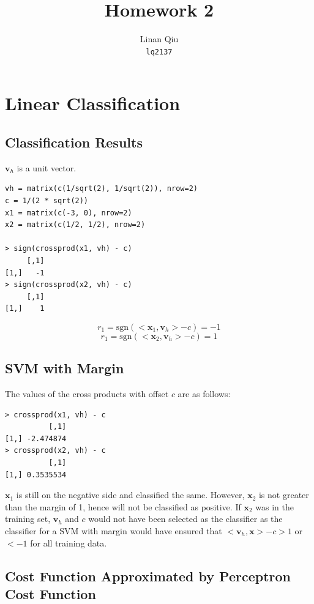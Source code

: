 \documentclass[11pt]{scrartcl}
\title{Homework 2}
\author{Linan Qiu\\\texttt{lq2137}}
\newcommand{\sgn}{\ensuremath{\mathrm{sgn}}}
\begin{document}
\maketitle

\section{Linear Classification}

\subsection{Classification Results}

$\mathbf{v}_h$ is a unit vector.

\begin{lstlisting}
vh = matrix(c(1/sqrt(2), 1/sqrt(2)), nrow=2)
c = 1/(2 * sqrt(2))
x1 = matrix(c(-3, 0), nrow=2)
x2 = matrix(c(1/2, 1/2), nrow=2)

> sign(crossprod(x1, vh) - c)
     [,1]
[1,]   -1
> sign(crossprod(x2, vh) - c)
     [,1]
[1,]    1
\end{lstlisting}

\[r_1 = \sgn(<\mathbf{x}_1, \mathbf{v}_h> - c) = -1 \]
\[r_1 = \sgn(<\mathbf{x}_2, \mathbf{v}_h> - c) = 1 \]

\subsection{SVM with Margin}

The values of the cross products with offset $c$ are as follows:

\begin{lstlisting}
> crossprod(x1, vh) - c
          [,1]
[1,] -2.474874
> crossprod(x2, vh) - c
          [,1]
[1,] 0.3535534
\end{lstlisting}

$\mathbf{x}_1$ is still on the negative side and classified the same. However, $\mathbf{x}_2$ is not greater than the margin of 1, hence will not be classified as positive. If $\mathbf{x}_2$ was in the training set, $\mathbf{v}_h$ and $c$ would not have been selected as the classifier as the classifier for a SVM with margin would have ensured that $<\mathbf{v}_h, \mathbf{x}> - c > 1$ or $< -1$ for all training data.

\subsection{Cost Function Approximated by Perceptron Cost Function}
\end{document}
